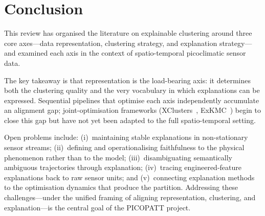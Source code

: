 \documentclass{article}
\theoremstyle{plain}
\theoremstyle{definition}
\theoremstyle{remark}
\begin{document}
\section{Conclusion}
\label{sec:conclusion}

This review has organised the literature on explainable clustering around
three core axes---data representation, clustering strategy, and
explanation strategy---and examined each axis in the context of
spatio-temporal picoclimatic sensor data.

The key takeaway is that representation is the load-bearing axis: it
determines both the clustering quality and the very vocabulary in which
explanations can be expressed. Sequential pipelines that optimise each
axis independently accumulate an alignment gap; joint-optimisation
frameworks (XClusters~\cite{hwang_xclusters_2023}, ExKMC~\cite{frost_exkmc_2020}) begin to
close this gap but have not yet been adapted to the full spatio-temporal
setting.

Open problems include: (i)~maintaining stable explanations in
non-stationary sensor streams; (ii)~defining and operationalising
faithfulness to the physical phenomenon rather than to the model;
(iii)~disambiguating semantically ambiguous trajectories through
explanation; (iv)~tracing engineered-feature explanations back to
raw sensor units; and (v)~connecting explanation methods to the
optimisation dynamics that produce the partition.
Addressing these challenges---under the unified framing of aligning
representation, clustering, and explanation---is the central goal of the
PICOPATT project.

%
\end{document}
